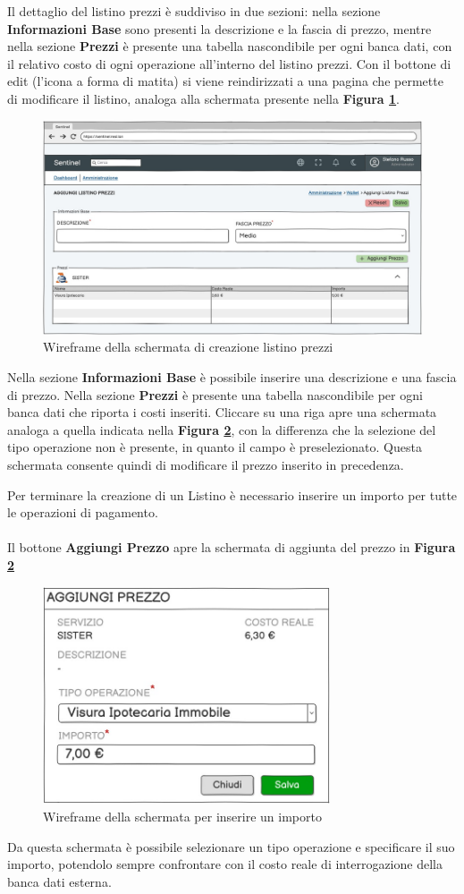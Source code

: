 Il dettaglio del listino prezzi \`e suddiviso in due sezioni: nella sezione \textbf{Informazioni Base} sono presenti la descrizione e la fascia di prezzo, mentre nella sezione
\textbf{Prezzi} \`e presente una tabella nascondibile per ogni banca dati, con il relativo costo di ogni operazione all'interno del listino prezzi.
Con il bottone di edit (l'icona a forma di matita) si viene reindirizzati a una pagina che permette di modificare il listino, analoga alla schermata presente nella \textbf{Figura \ref{aggiungilistino}}.

\begin{figure}[H]
  \centering
  \includegraphics[width=13cm]{images/gestione-listini/add-listino.png}
  \caption{Wireframe della schermata di creazione listino prezzi}
  \label{aggiungilistino}
\end{figure}
Nella sezione \textbf{Informazioni Base} \`e possibile inserire una descrizione e una fascia di prezzo.
Nella sezione \textbf{Prezzi} \`e presente una tabella nascondibile per ogni banca dati che riporta i costi inseriti.
Cliccare su una riga apre una schermata analoga a quella indicata nella \textbf{Figura \ref{aggiungiprezzo}}, con la differenza che la selezione del tipo operazione
non \`e presente, in quanto il campo \`e preselezionato. Questa schermata consente quindi di modificare il prezzo inserito in precedenza.

Per terminare la creazione di un Listino \`e necessario inserire un importo per tutte le operazioni di pagamento.
\\\\
Il bottone \textbf{Aggiungi Prezzo} apre la schermata di aggiunta del prezzo in \textbf{Figura \ref{aggiungiprezzo}}
\begin{figure}[H]
  \centering
  \includegraphics[width=8.5cm]{images/gestione-listini/aggiungi-prezzo.png}
  \caption{Wireframe della schermata per inserire un importo}
  \label{aggiungiprezzo}
\end{figure}

Da questa schermata \`e possibile selezionare un tipo operazione e specificare il suo importo, potendolo sempre confrontare con il costo reale di interrogazione della banca dati esterna.
